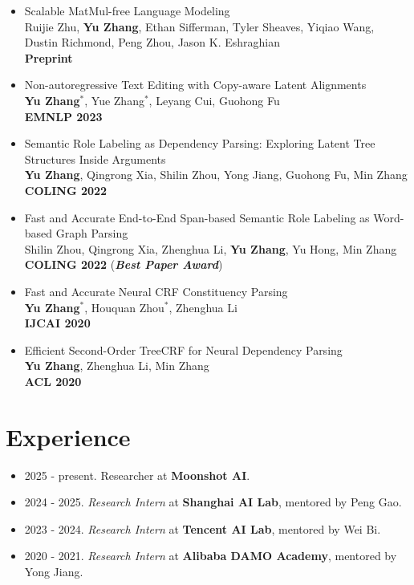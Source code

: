 \documentclass[a4paper,12pt]{article}
\begin{document}
\begin{itemize}[leftmargin=15pt]
            \textbf{NeurIPS 2024}
      \item Scalable MatMul-free Language Modeling \\
            Ruijie Zhu, \textbf{Yu Zhang}, Ethan Sifferman, Tyler Sheaves, Yiqiao Wang, Dustin Richmond, Peng Zhou, Jason K. Eshraghian \\
            \textbf{Preprint}
      \item Non-autoregressive Text Editing with Copy-aware Latent Alignments \\
            \textbf{Yu Zhang$^*$}, Yue Zhang$^*$, Leyang Cui, Guohong Fu\\
            \textbf{EMNLP 2023}
      \item Semantic Role Labeling as Dependency Parsing: Exploring Latent Tree Structures Inside Arguments\\
            \textbf{Yu Zhang}, Qingrong Xia, Shilin Zhou, Yong Jiang, Guohong Fu, Min Zhang\\
            \textbf{COLING 2022}
      \item Fast and Accurate End-to-End Span-based Semantic Role Labeling as Word-based Graph Parsing\\
            Shilin Zhou, Qingrong Xia, Zhenghua Li, \textbf{Yu Zhang}, Yu Hong, Min Zhang\\
            \textbf{COLING 2022} (\textbf{\emph{\textcolor{brickred}{Best Paper Award}}})
      \item Fast and Accurate Neural CRF Constituency Parsing\\
            \textbf{Yu Zhang$^*$}, Houquan Zhou$^*$, Zhenghua Li\\
            \textbf{IJCAI 2020}
      \item Efficient Second-Order TreeCRF for Neural Dependency Parsing\\
            \textbf{Yu Zhang}, Zhenghua Li, Min Zhang\\
            \textbf{ACL 2020}
\end{itemize}

\newpage
\section{Experience}
\begin{itemize}[leftmargin=18pt]
      \item 2025 - present. Researcher at \textbf{Moonshot AI}.
      \item 2024 - 2025. \emph{Research Intern} at \textbf{Shanghai AI Lab}, mentored by Peng Gao.
      \item 2023 - 2024. \emph{Research Intern} at \textbf{Tencent AI Lab}, mentored by Wei Bi.
      \item 2020 - 2021. \emph{Research Intern} at \textbf{Alibaba DAMO Academy}, mentored by Yong Jiang.
\end{itemize}
\end{document}
